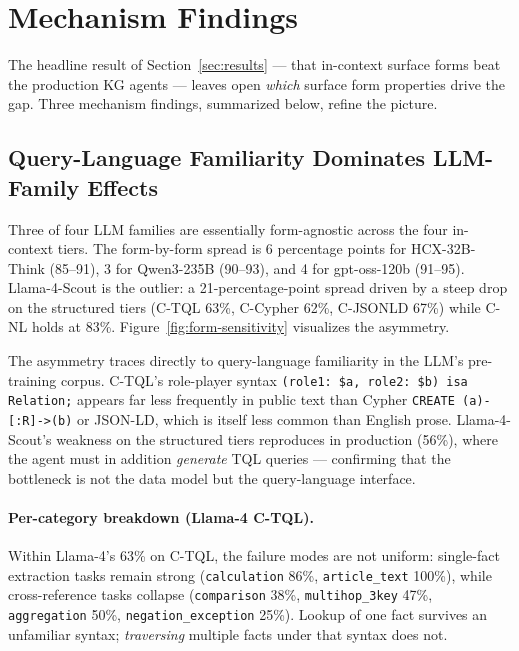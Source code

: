 \section{Mechanism Findings}\label{sec:mechanism}

The headline result of Section~\ref{sec:results} — that in-context
surface forms beat the production KG agents — leaves open
\emph{which} surface form properties drive the gap. Three mechanism
findings, summarized below, refine the picture.

\subsection{Query-Language Familiarity Dominates LLM-Family Effects}

Three of four LLM families are essentially form-agnostic across the
four in-context tiers. The form-by-form spread is 6 percentage
points for HCX-32B-Think (85--91), 3 for Qwen3-235B (90--93), and
4 for gpt-oss-120b (91--95). Llama-4-Scout is the outlier: a
21-percentage-point spread driven by a steep drop on the structured
tiers (C-TQL 63\%, C-Cypher 62\%, C-JSONLD 67\%) while C-NL holds at
83\%. Figure~\ref{fig:form-sensitivity} visualizes the asymmetry.



The asymmetry traces directly to query-language familiarity in the
LLM's pre-training corpus. C-TQL's role-player syntax \texttt{(role1:
\$a, role2: \$b) isa Relation;} appears far less frequently in
public text than Cypher \texttt{CREATE (a)-[:R]->(b)} or JSON-LD,
which is itself less common than English prose. Llama-4-Scout's
weakness on the structured tiers reproduces in production
 (56\%), where the agent must in addition
\emph{generate} TQL queries — confirming that the bottleneck is not
the data model but the query-language interface.

\paragraph{Per-category breakdown (Llama-4 C-TQL).}
Within Llama-4's 63\% on C-TQL, the failure modes are not uniform:
single-fact extraction tasks remain strong (\texttt{calculation}
86\%, \texttt{article\_text} 100\%), while cross-reference tasks
collapse (\texttt{comparison} 38\%, \texttt{multihop\_3key} 47\%,
\texttt{aggregation} 50\%, \texttt{negation\_exception} 25\%).
Lookup of one fact survives an unfamiliar syntax; \emph{traversing}
multiple facts under that syntax does not.

